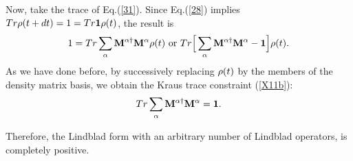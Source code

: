 \documentclass[aps,pra,twocolumn,amssymb, amsfonts,amsmath,showpacs, superscriptaddress]{revtex4}
\begin{document}
Now, take the trace of Eq.(\ref{31}). Since Eq.(\ref{28}) implies $Tr{\bf\rho}(t+dt)=1=Tr{\bf 1}{\bf\rho}(t)$, the result is
\begin{equation}\label{32}
1=Tr\sum_{\alpha}{\bf M}^{\alpha\dagger}{\bf M}^{\alpha}{\bf\rho}(t) \hbox{ or }Tr\Big[\sum_{\alpha}{\bf M}^{\alpha\dagger}{\bf M}^{\alpha}-{\bf 1}\Big]{\bf\rho}(t).
\end{equation}
\noindent As we have done before,  by successively replacing ${\bf\rho}(t)$ by the members of the density matrix basis, we obtain the Kraus trace constraint (\ref{X11b}):
\begin{equation}\label{32}
Tr\sum_{\alpha}{\bf M}^{\alpha\dagger}{\bf M}^{\alpha}={\bf 1}.
\end{equation}
 
 Therefore, the Lindblad form with an arbitrary number of Lindblad operators, is completely positive. 
 
\end{document}

